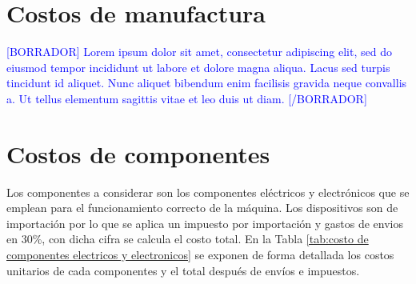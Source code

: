 \section{Costos de manufactura}

\textcolor{blue}{[BORRADOR] Lorem ipsum dolor sit amet, consectetur adipiscing elit, sed do eiusmod tempor incididunt ut labore et dolore magna aliqua. Lacus sed turpis tincidunt id aliquet. Nunc aliquet bibendum enim facilisis gravida neque convallis a. Ut tellus elementum sagittis vitae et leo duis ut diam. [/BORRADOR]} 

\section{Costos de componentes}

Los componentes a considerar son los componentes eléctricos y electrónicos que se emplean para el funcionamiento correcto de la máquina. Los dispositivos son de importación por lo que se aplica un impuesto por importación y gastos de envios en 30\%, con dicha cifra se calcula el costo total. En la Tabla \ref{tab:costo de componentes electricos y electronicos} se exponen de forma detallada los costos unitarios de cada componentes y el total después de envíos e impuestos.

